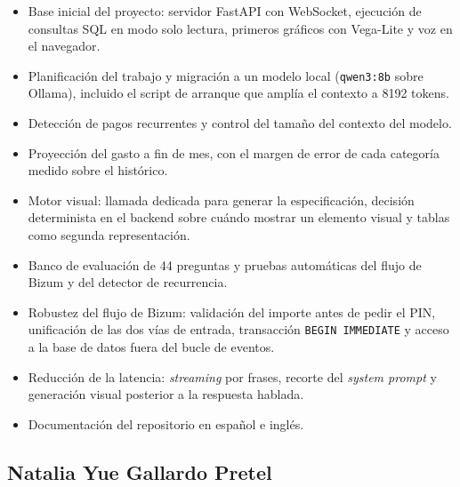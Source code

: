 \begin{itemize}
    \item Base inicial del proyecto: servidor FastAPI con WebSocket, ejecución
    de consultas SQL en modo solo lectura, primeros gráficos con Vega-Lite y
    voz en el navegador.
    \item Planificación del trabajo y migración a un modelo local
    (\texttt{qwen3:8b} sobre Ollama), incluido el script de arranque que amplía
    el contexto a 8192 tokens.
    \item Detección de pagos recurrentes y control del tamaño del contexto del
    modelo.
    \item Proyección del gasto a fin de mes, con el margen de error de cada
    categoría medido sobre el histórico.
    \item Motor visual: llamada dedicada para generar la especificación,
    decisión determinista en el backend sobre cuándo mostrar un elemento visual
    y tablas como segunda representación.
    \item Banco de evaluación de 44 preguntas y pruebas automáticas del flujo
    de Bizum y del detector de recurrencia.
    \item Robustez del flujo de Bizum: validación del importe antes de pedir el
    PIN, unificación de las dos vías de entrada, transacción
    \texttt{BEGIN IMMEDIATE} y acceso a la base de datos fuera del bucle de
    eventos.
    \item Reducción de la latencia: \textit{streaming} por frases, recorte del
    \textit{system prompt} y generación visual posterior a la respuesta hablada.
    \item Documentación del repositorio en español e inglés.
\end{itemize}

\subsection{Natalia Yue Gallardo Pretel}

